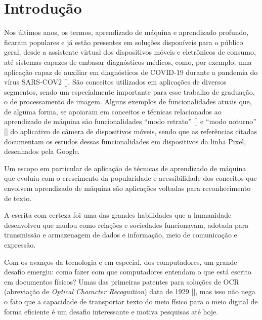 
\chapter[Introdução]{Introdução}

Nos últimos anos, os termos, aprendizado de máquina e aprendizado profundo, ficaram populares e já estão presentes em soluções 
disponíveis para o público geral, desde a assistente virtual dos dispositivos móveis e eletrônicos de consumo, até sistemas capazes 
de embasar diagnósticos médicos, como, por exemplo, uma aplicação capaz de auxiliar em diagnósticos de COVID-19 durante a pandemia do 
vírus SARS-COV2 []. São conceitos utilizados em aplicações de diversos segmentos, sendo um especialmente 
importante para esse trabalho de graduação, o de processamento de imagem. Alguns exemplos de funcionalidades atuais 
que, de alguma forma, se apoiaram em conceitos e técnicas relacionados ao aprendizado de máquina são funcionalidades “modo retrato” [] 
e “modo noturno” [] do aplicativo de câmera de dispositivos móveis, sendo que as referências citadas documentam 
os estudos dessas funcionalidades em dispositivos da linha Pixel, desenhados pela Google.

Um escopo em particular de aplicação de técnicas de aprendizado de máquina que evoluiu com o crescimento da popularidade e 
acessibilidade dos conceitos que envolvem aprendizado de máquina são aplicações voltadas para reconhecimento de texto. 

A escrita com certeza foi uma das grandes habilidades que a humanidade desenvolveu que mudou como relações e sociedades funcionavam, adotada 
para transmissão e armazenagem de dados e informação, meio de comunicação e expressão.

Com os avanços da tecnologia e em especial, dos computadores, um grande desafio emergiu: como fazer com que computadores entendam o que está 
escrito em documentos físicos? Umas das primeiras patentes para soluções de OCR (abreviação de \textit{Optical Character Recognition}) data 
de 1929 [], mas isso não nega o fato que a capacidade de transportar texto do meio físico para o meio digital de 
forma eficiente é um desafio interessante e motiva pesquisas até hoje.

